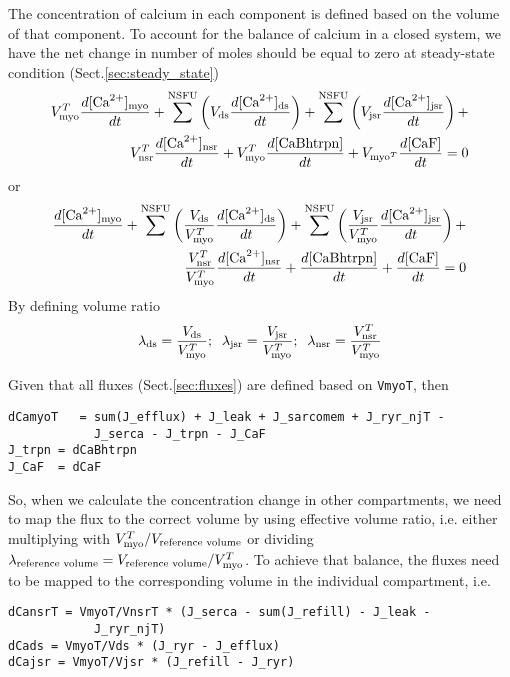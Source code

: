 The concentration of calcium in each component is defined based on the volume of
that component. To account for the balance of calcium in a closed system, we
have the net change in number of moles should be equal to zero at steady-state
condition (Sect.\ref{sec:steady_state})
\begin{equation}
  \label{eq:5}
  \begin{split}
    V_{\text{myo}}^T \frac{d[{\text{Ca}^{2+}}]_{\text{myo}}}{dt} + \sum^{\text{NSFU}} 
  \left(V_{\text{ds}}\frac{d[{\text{Ca}^{2+}}]_{\text{ds}}}{dt}\right) + \sum^{\text{NSFU}}
  \left(V_{\text{jsr}}\frac{d[{\text{Ca}^{2+}}]_{\text{jsr}}}{dt}\right) + \\
  V_{\text{nsr}}^T
  \frac{d[{\text{Ca}^{2+}}]_{\text{nsr}}}{dt} + V_{\text{myo}}^T \frac{d[{\text{CaBhtrpn}}]}{dt} + V_{\text{myo}^T}
  \frac{d[\text{CaF}]}{dt} = 0
  \end{split}
\end{equation}
or
\begin{equation}
  \label{eq:3}
  \begin{split}
     \frac{d[{\text{Ca}^{2+}}]_{\text{myo}}}{dt} + \sum^{\text{NSFU}} 
  \left(\frac{V_{\text{ds}}}{V_{\text{myo}}^T}\frac{d[{\text{Ca}^{2+}}]_{\text{ds}}}{dt}\right) + \sum^{\text{NSFU}}
  \left(\frac{V_{\text{jsr}}}{V_{\text{myo}}^T}\frac{d[{\text{Ca}^{2+}}]_{\text{jsr}}}{dt}\right) + \\
  \frac{V_{\text{nsr}}^T}{V_{\text{myo}}^T} \frac{d[{\text{Ca}^{2+}}]_{\text{nsr}}}{dt} + \frac{d[{\text{CaBhtrpn}}]}{dt} +
  \frac{d[\text{CaF}]}{dt} = 0
    \end{split}    
\end{equation}
By defining volume ratio
\begin{equation}
\lambda_{\text{ds}} = \frac{V_{\text{ds}}}{V_{\text{myo}}^T};\;\;
\lambda_{\text{jsr}} = \frac{V_{\text{jsr}}}{V_{\text{myo}}^T};\;\;
\lambda_{\text{nsr}} = \frac{V_{\text{nsr}}^T}{V_{\text{myo}}^T}
\end{equation}

Given that all fluxes (Sect.\ref{sec:fluxes}) are defined based on \verb!VmyoT!,
then
\begin{verbatim}
dCamyoT   = sum(J_efflux) + J_leak + J_sarcomem + J_ryr_njT -  
            J_serca - J_trpn - J_CaF
J_trpn = dCaBhtrpn
J_CaF  = dCaF     
\end{verbatim}
So, when we calculate the concentration change in other compartments, we need to
map the flux to the correct volume by using effective volume ratio, i.e. either
multiplying with  $V_{\text{myo}}^T/V_\text{reference volume}$ or dividing
$\lambda_\text{reference volume} = V_\text{reference volume}/V_{\text{myo}}^T$.
To achieve that balance, the fluxes need to be mapped to the corresponding
volume in the individual compartment, i.e. 
\begin{verbatim}
dCansrT = VmyoT/VnsrT * (J_serca - sum(J_refill) - J_leak - 
            J_ryr_njT)
dCads = VmyoT/Vds * (J_ryr - J_efflux)
dCajsr = VmyoT/Vjsr * (J_refill - J_ryr)
\end{verbatim}

